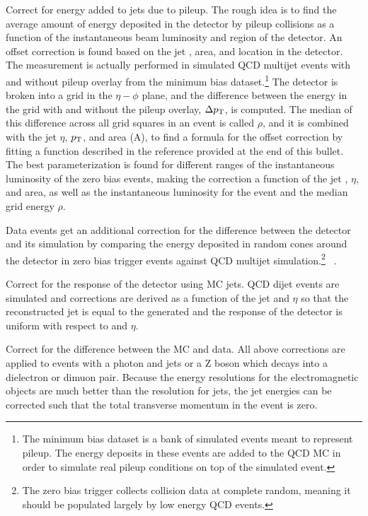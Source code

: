     \begin{enumerate}
       Correct for energy added to jets due to pileup. The rough idea is to find the average amount of energy deposited in the detector by pileup collisions as a function of the instantaneous beam luminosity and region of the detector. An offset correction is found based on the jet \pt, area, and location in the detector. The measurement is actually performed in simulated QCD multijet events with and without pileup overlay from the minimum bias dataset.\footnote{The minimum bias dataset is a bank of simulated events meant to represent pileup. The energy deposits in these events are added to the QCD MC in order to simulate real pileup conditions on top of the simulated event.} The detector is broken into a grid in the $\eta-\phi$ plane, and the difference between the energy in the grid with and without the pileup overlay, $\Delta p_{\mathrm{T}}$, is computed. The median of this difference across all grid squares in an event is called $\rho$, and it is combined with the jet $\eta$, $p_{\mathrm{T}}$, and area (A), to find a formula for the offset correction by fitting a function described in the reference provided at the end of this bullet. The best parameterization is found for different ranges of the instantaneous luminosity of the zero bias events, making the correction a function of the jet \pt, $\eta$, and area, as well as the instantaneous luminosity for the event and the median grid energy $\rho$. 

      Data events get an additional correction for the difference between the detector and its simulation by comparing the energy deposited in random cones around the detector in zero bias trigger events against QCD multijet simulation.\footnote{The zero bias trigger collects collision data at complete random, meaning it should be populated largely by low energy QCD events.} ~\cite[sec. 4.3]{JEC_2016}.

       Correct for the response of the detector using MC jets. QCD dijet events are simulated and corrections are derived as a function of the jet \pt and $\eta$ so that the reconstructed jet \pt is equal to the generated \pt and the response of the detector is uniform with respect to \pt and $\eta$.\cite[sec. 6.3]{jetmet_2011} ~\cite[sec. 5]{JEC_2016}

       Correct for the difference between the MC and data. All above corrections are applied to events with a photon and jets or a Z boson which decays into a dielectron or dimuon pair. Because the energy resolutions for the electromagnetic objects are much better than the resolution for jets, the jet energies can be corrected such that the total transverse momentum in the event is zero.\cite[sec. 6.3]{jetmet_2011} ~\cite[sec. 6]{JEC_2016}
    \end{enumerate}

